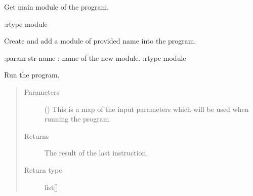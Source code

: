 \documentclass[letterpaper,10pt,english]{sphinxmanual}
\begin{document}

\begin{fulllineitems}
\label{\detokenize{reference/py:migraphx.get_main_module}}
\sphinxAtStartPar
Get main module of the program.

\sphinxAtStartPar
:rtype module

\end{fulllineitems}


\begin{fulllineitems}
\label{\detokenize{reference/py:migraphx.create_module}}
\sphinxAtStartPar
Create and add a module of provided name into the program.

\sphinxAtStartPar
:param str name : name of the new module.
:rtype module

\end{fulllineitems}


\begin{fulllineitems}
\label{\detokenize{reference/py:migraphx.run}}
\sphinxAtStartPar
Run the program.
\begin{quote}\begin{description}
\item[{Parameters}] \leavevmode
\sphinxAtStartPar
{} (\sphinxstyleliteralemphasis{\sphinxupquote{{[}}}\sphinxstyleliteralemphasis{\sphinxupquote{{]}}}) \textendash{} This is a map of the input parameters which will be used when running the program.

\item[{Returns}] \leavevmode
\sphinxAtStartPar
The result of the last instruction.

\item[{Return type}] \leavevmode
\sphinxAtStartPar
list{[}{\hyperref[\detokenize{reference/py:migraphx.argument}]{}}{]}

\end{description}\end{quote}

\end{fulllineitems}
\end{document}
